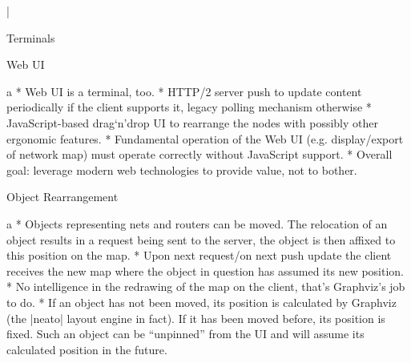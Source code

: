 
\typosize[14/18]
\activettchar|

\chap Terminals

\sec Web UI

\begitems\style a
* Web UI is a terminal, too.
* HTTP/2 server push to update content periodically if the client supports it,
  legacy polling mechanism otherwise
* JavaScript-based drag`n'drop UI to rearrange the nodes with possibly other
  ergonomic features.
* Fundamental operation of the Web UI (e.g. display/export of network map)
  must operate correctly without JavaScript support.
* Overall goal: leverage modern web technologies to provide value, not to bother.
\enditems

\secc Object Rearrangement

\begitems\style a
* Objects representing nets and routers can be moved. The relocation of an object
  results in a request being sent to the server, the object is then affixed to
  this position on the map.
* Upon next request/on next push update the client receives the new map where
  the object in question has assumed its new position.
* No intelligence in the redrawing of the map on the client, that's Graphviz's
  job to do.
* If an object has not been moved, its position is calculated by Graphviz
  (the |neato| layout engine in fact). If it has been moved before, its position
  is fixed. Such an object can be ``unpinned'' from the UI and will assume its
  calculated position in the future.
\enditems

\bye

